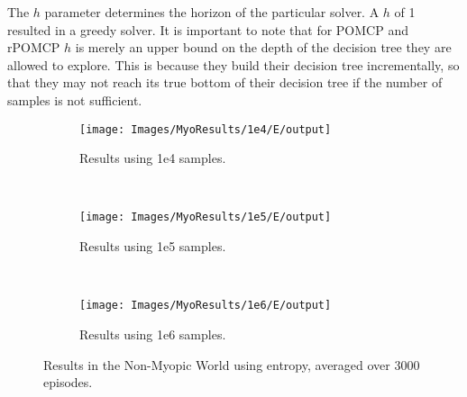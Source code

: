 The $h$ parameter determines the horizon of the particular solver. A $h$ of 1  resulted in a greedy
solver. It is important to note that for POMCP and rPOMCP $h$ is merely an upper bound on the depth
of the decision tree they are allowed to explore. This is because they build their decision tree
incrementally, so that they may not reach its true bottom of their decision tree if the number of
samples is not sufficient.

\begin{figure}[ht]
        \centering
        \begin{subfigure}[t]{0.3\textwidth}
                \texttt{[image: Images/MyoResults/1e4/E/output]}
                \caption{Results using 1e4 samples.}
                \label{fig:m4e}
        \end{subfigure}%
        ~ %
        \begin{subfigure}[t]{0.3\textwidth}
                \texttt{[image: Images/MyoResults/1e5/E/output]}
                \caption{Results using 1e5 samples.}
                \label{fig:m5e}
        \end{subfigure}
        ~ %
        \begin{subfigure}[t]{0.3\textwidth}
                \texttt{[image: Images/MyoResults/1e6/E/output]}
                \caption{Results using 1e6 samples.}
                \label{fig:m6e}
        \end{subfigure}
        \caption{Results in the Non-Myopic World using entropy, averaged over 3000 episodes.}
        \label{ref:myoentropyfig}
\end{figure}




